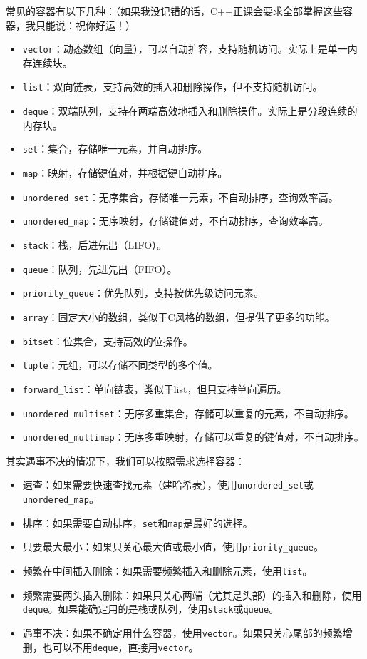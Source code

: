 \documentclass[../main.tex]{subfiles}
\begin{document}
常见的容器有以下几种：（如果我没记错的话，C++正课会要求全部掌握这些容器，我只能说：祝你好运！）
\begin{itemize}
  \item \texttt{vector}：动态数组（向量），可以自动扩容，支持随机访问。实际上是单一内存连续块。
  \item \texttt{list}：双向链表，支持高效的插入和删除操作，但不支持随机访问。
  \item \texttt{deque}：双端队列，支持在两端高效地插入和删除操作。实际上是分段连续的内存块。
  \item \texttt{set}：集合，存储唯一元素，并自动排序。
  \item \texttt{map}：映射，存储键值对，并根据键自动排序。
  \item \texttt{unordered\_set}：无序集合，存储唯一元素，不自动排序，查询效率高。
  \item \texttt{unordered\_map}：无序映射，存储键值对，不自动排序，查询效率高。
  \item \texttt{stack}：栈，后进先出（LIFO）。
  \item \texttt{queue}：队列，先进先出（FIFO）。
  \item \texttt{priority\_queue}：优先队列，支持按优先级访问元素。
  \item \texttt{array}：固定大小的数组，类似于C风格的数组，但提供了更多的功能。
  \item \texttt{bitset}：位集合，支持高效的位操作。
  \item \texttt{tuple}：元组，可以存储不同类型的多个值。
  \item \texttt{forward\_list}：单向链表，类似于list，但只支持单向遍历。
  \item \texttt{unordered\_multiset}：无序多重集合，存储可以重复的元素，不自动排序。
  \item \texttt{unordered\_multimap}：无序多重映射，存储可以重复的键值对，不自动排序。
\end{itemize}
其实遇事不决的情况下，我们可以按照需求选择容器：
\begin{itemize}
  \item 速查：如果需要快速查找元素（建哈希表），使用\texttt{unordered\_set}或\texttt{unordered\_map}。
  \item 排序：如果需要自动排序，\texttt{set}和\texttt{map}是最好的选择。
  \item 只要最大最小：如果只关心最大值或最小值，使用\texttt{priority\_queue}。
  \item 频繁在中间插入删除：如果需要频繁插入和删除元素，使用\texttt{list}。
  \item 频繁需要两头插入删除：如果只关心两端（尤其是头部）的插入和删除，使用\texttt{deque}。如果能确定用的是栈或队列，使用\texttt{stack}或\texttt{queue}。
  \item 遇事不决：如果不确定用什么容器，使用\texttt{vector}。如果只关心尾部的频繁增删，也可以不用\texttt{deque}，直接用\texttt{vector}。
\end{itemize}
\end{document}
